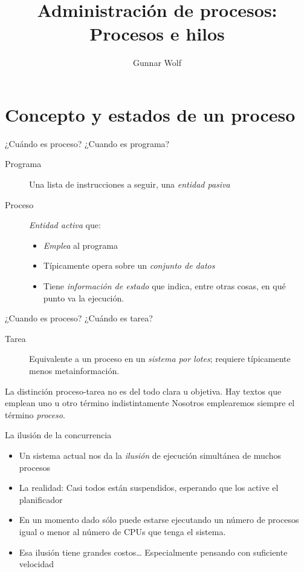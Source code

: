 \documentclass[presentation]{beamer}
\author{Gunnar Wolf}
\date{}
\title{Administración de procesos: Procesos e hilos}
\begin{document}
\maketitle

\section{Concepto y estados de un proceso}
\label{sec:org8674b1c}

\begin{frame}[label={sec:orga0070e7}]{¿Cuándo es proceso? ¿Cuando es programa?}
\begin{description}
\item[{Programa}] Una lista de instrucciones a seguir, una \emph{entidad
pasiva}
\item[{Proceso}] \emph{Entidad activa} que:
\begin{itemize}
\item \emph{Emplea} al programa
\item Típicamente opera sobre un \emph{conjunto de datos}
\item Tiene \emph{información de estado} que indica, entre otras cosas, en
qué punto va la ejecución.
\end{itemize}
\end{description}
\end{frame}

\begin{frame}[label={sec:org3f16589}]{¿Cuando es proceso? ¿Cuándo es tarea?}
\begin{description}
\item[{Tarea}] Equivalente a un proceso en un \emph{sistema por lotes};
requiere típicamente menos metainformación.
\end{description}
\begin{center}
La distinción proceso-tarea no es del todo clara u objetiva.
\vfill
Hay textos que emplean uno u otro término indistintamente
\vfill
Nosotros emplearemos siempre el término \emph{proceso}.
\end{center}
\end{frame}

\begin{frame}[label={sec:orgb298802}]{La ilusión de la concurrencia}
\begin{itemize}
\item Un sistema actual nos da la \emph{ilusión} de ejecución simultánea de
muchos procesos
\item La realidad: Casi todos están suspendidos, esperando que los active
el planificador
\item En un momento dado sólo puede estarse ejecutando un número de
procesos igual o menor al número de CPUs que tenga el sistema.
\item Esa ilusión tiene grandes costos\ldots{} Especialmente pensando con
suficiente velocidad
\end{itemize}
\end{frame}
\end{document}
